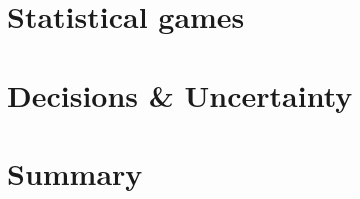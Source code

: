 \documentclass{beamer}
\begin{document}
\section{Statistical games}
\subsection{}
\begin{frame}{}

\end{frame}


\begin{frame}{}

\end{frame}

\section{Decisions \& Uncertainty}

\begin{frame}{}

\end{frame}

\section{Summary}

\begin{frame}{}

\end{frame}
\end{document}
